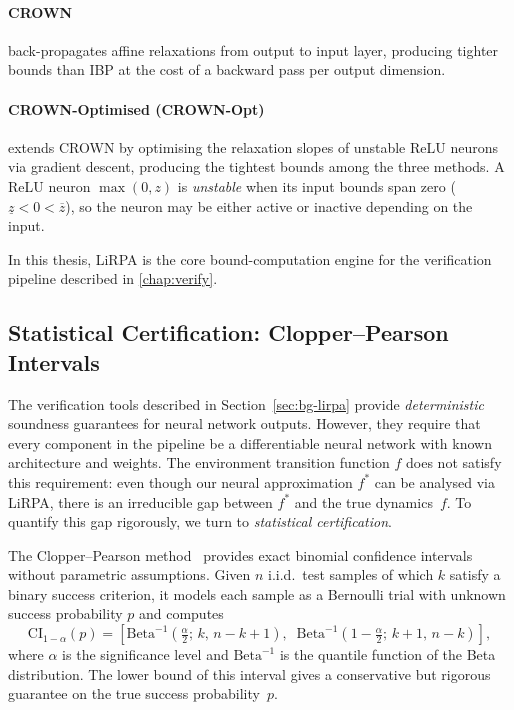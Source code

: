 \documentclass[thesis]{uofithesis} %
\begin{document}
    \paragraph{CROWN~\cite{crown}}
    back-propagates affine relaxations from output to input layer,
    producing tighter bounds than IBP at the cost of a backward pass per output dimension.

    \paragraph{CROWN-Optimised (CROWN-Opt)~\cite{crown-opt}}
    extends CROWN by optimising the relaxation slopes of unstable
    ReLU neurons via gradient descent, producing the tightest bounds
    among the three methods.  A ReLU neuron $\max(0, z)$ is
    \emph{unstable} when its input bounds span zero
    ($\underline{z} < 0 < \overline{z}$), so the neuron may be
    either active or inactive depending on the input.

    In this thesis, LiRPA is the core bound-computation engine for the
    verification pipeline described in \ref{chap:verify}.
    
    
    \subsection{Statistical Certification: Clopper--Pearson Intervals}
    \label{sec:bg-cp}
    
    The verification tools described in Section~\ref{sec:bg-lirpa} provide
    \emph{deterministic} soundness guarantees for neural network outputs.
    However, they require that every component in the pipeline be a
    differentiable neural network with known architecture and weights.
    The environment transition function $f$ does not satisfy this
    requirement: even though our neural approximation $f^{\ast}$ can be
    analysed via LiRPA, there is an irreducible gap between $f^{\ast}$ and
    the true dynamics~$f$.
    To quantify this gap rigorously, we turn to \emph{statistical
    certification}.
    
    The Clopper--Pearson method~\cite{clopper-pearson} provides exact
    binomial confidence intervals without parametric assumptions.
    Given $n$ i.i.d.\ test samples of which $k$ satisfy a binary success
    criterion, it models each sample as a Bernoulli trial with unknown
    success probability $p$ and computes
    \begin{equation}
        \mathrm{CI}_{1-\alpha}(p)
        = \left[
            \mathrm{Beta}^{-1}\!\!\left(\tfrac{\alpha}{2};\, k,\, n{-}k{+}1\right),\;\;
            \mathrm{Beta}^{-1}\!\!\left(1 - \tfrac{\alpha}{2};\, k{+}1,\, n{-}k\right)
        \right],
        \label{eq:cp}
    \end{equation}
    where $\alpha$ is the significance level and $\mathrm{Beta}^{-1}$ is
    the quantile function of the Beta distribution.
    The lower bound of this interval gives a conservative but rigorous
    guarantee on the true success probability~$p$.
    
\end{document}
